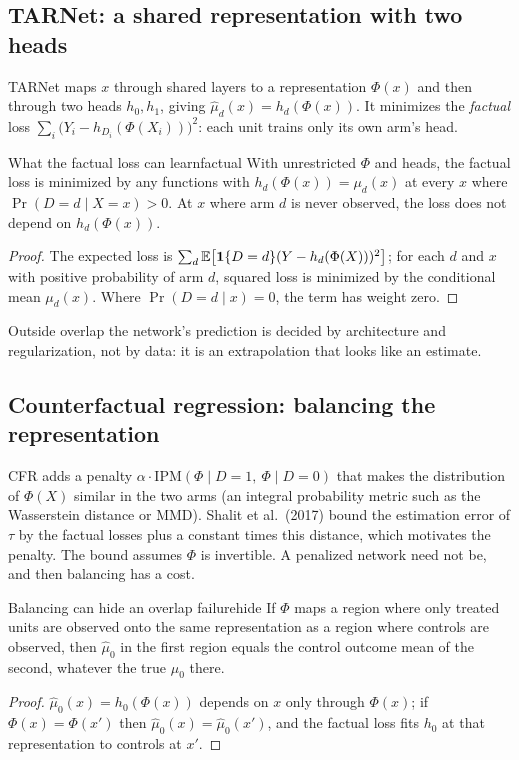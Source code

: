 \documentclass[11pt]{article}
\begin{document}
\subsection{TARNet: a shared representation with two heads}

TARNet maps $x$ through shared layers to a representation $\Phi(x)$ and then through two heads $h_0, h_1$, giving
$\hat\mu_d(x) = h_d(\Phi(x))$. It minimizes the \emph{factual} loss
$\sum_i \big(Y_i - h_{D_i}(\Phi(X_i))\big)^2$: each unit trains only its own arm's head.

\begin{prop}{What the factual loss can learn}{factual}
With unrestricted $\Phi$ and heads, the factual loss is minimized by any functions with $h_d(\Phi(x)) = \mu_d(x)$ at
every $x$ where $\Pr(D = d \mid X = x) > 0$. At $x$ where arm $d$ is never observed, the loss does not depend on
$h_d(\Phi(x))$.
\end{prop}
\begin{proof}
The expected loss is $\sum_d \mathbb{E}\big[\mathbf{1}\{D=d\}(Y - h_d(\Phi(X)))^2\big]$; for each $d$ and $x$ with positive
probability of arm $d$, squared loss is minimized by the conditional mean $\mu_d(x)$. Where $\Pr(D=d \mid x) = 0$, the
term has weight zero.
\end{proof}

Outside overlap the network's prediction is decided by architecture and regularization, not by data: it is an
extrapolation that looks like an estimate.

\subsection{Counterfactual regression: balancing the representation}

CFR adds a penalty $\alpha \cdot \text{IPM}(\Phi \mid D=1,\ \Phi \mid D=0)$ that makes the distribution of $\Phi(X)$ similar
in the two arms (an integral probability metric such as the Wasserstein distance or MMD). Shalit et al.\ (2017) bound the estimation error of $\tau$ by the factual losses plus a constant times this distance, which
motivates the penalty. The bound assumes $\Phi$ is invertible. A penalized network need not be, and then balancing has
a cost.

\begin{prop}{Balancing can hide an overlap failure}{hide}
If $\Phi$ maps a region where only treated units are observed onto the same representation as a region where
controls are observed, then $\hat\mu_0$ in the first region equals the control outcome mean of the second, whatever
the true $\mu_0$ there.
\end{prop}
\begin{proof}
$\hat\mu_0(x) = h_0(\Phi(x))$ depends on $x$ only through $\Phi(x)$; if $\Phi(x) = \Phi(x')$ then $\hat\mu_0(x) = \hat\mu_0(x')$, and
the factual loss fits $h_0$ at that representation to controls at $x'$.
\end{proof}
\end{document}
